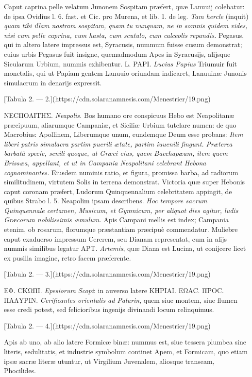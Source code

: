 \documentclass[a4paper, 11pt, oneside, polutonikogreek, latin]{article}
\begin{document}
Caput caprina pelle velatum Junonem Sospitam præfert, quæ Lanuuij colebatur: de ipsa Ovidius l. 6. fast. et Cic. pro Murena, et lib. 1. de leg. \emph{Tam hercle} (inquit) \emph{quam tibi illam nostram sospitam, quam tu nunquam, ne in somnis quidem vides, nisi cum pelle caprina, cum hasta, cum scutulo, cum calceolis repandis.} Pegasus, qui in altero latere impressus est, Syracusis, nummum fuisse cusum demonstrat; cuius urbis Pegasus fuit insigne, quemadmodum Apes in Syracusijs, alijsque Sicularum Urbium, nummis exhibentur. L. PAPI. \emph{Lucius Papius} Triumuir fuit monetalis, qui ut Papiam gentem Lanuuio oriundam indicaret, Lanuuinæ Junonis simulacrum in denarijs expressit.

[Tabula 2. --- 2.](https://cdn.solaranamnesis.com/Menestrier/19.png)

NECΠOΛITHΣ. \emph{Neapolis.} Bos humano ore conspicuus Hebo est Neapolitanæ præcipuum, aliarumque Campaniæ, et Siciliæ Urbium tutelare numen: de quo Macrobius: Apollinem, Liberumque unum, eundemque Deum esse probans: \emph{Item liberi patris simulacra partim puerili ætate, partim iuuenili fingunt. Præterea barbatà specie, senili quoque, ut Græci eius, quem Bacchapæam, item quem Brissæa, appellant, et ut in Campania Neapolitani celebrant Hebona cognominantes.} Eiusdem numinis ratio, et figura, promissa barba, ad radiorum similitudinem, virtutem Solis in terrena demonstrat. Victoria quæ super Hebonis caput coronam præfert, Ludorum Quinquennalium celebritatem appingit, de quibus Strabo l. 5. Neapolim ipsam describens. \emph{Hoc tempore sacrum Quinquennale certamen, Musicum, et Gymnicum, per aliquot dies agitur, ludis Græcorum nobilissimis æmulum.} Apis Campani mellis est index; Campania etenim, ob rosarum, florumque præstantiam præcipuè commendatur. Muliebre caput exaduerso impressum Cererem, seu Dianam representat, cum in alijs nummis similibus legatur APT. \emph{Artemis}, quæ Diana est Lucina, ut conijcere licet ex pusilla imagine, retro facem præferente.

[Tabula 2. --- 3.](https://cdn.solaranamnesis.com/Menestrier/19.png)

EΦ. CKΩΠI. \emph{Epesiorum Scopi}: in auverso latere KHPIAI. EΩAC. ΠPOC. ΠAΛYPIN. \emph{Cerificantes orientalis ad Palurin}, quem siue montem, siue flumen esse credi potest, sed felicioribus ingenijs divinandi locum relinquimus.

[Tabula 2. --- 4.](https://cdn.solaranamnesis.com/Menestrier/19.png)

Apis ab uno, ab alio latere Formicæ binæ: nummus est, siue tessera plumbea sine literis, sedulitatis, et industrie symbolum continet Apem, et Formicam, quo etiam ipsæ sacræ literæ utuntur, ut Virgilium Juvenalem, aliosque transeam, Phocilides.
\end{document}
